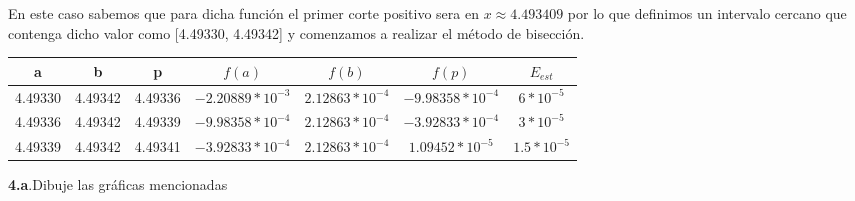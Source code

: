 \documentclass[12pt]{article}
\begin{document}
En este caso sabemos que para dicha función el primer corte positivo sera en $x \approx 4.493409$ por lo que definimos un intervalo cercano que contenga dicho valor como [4.49330, 4.49342]
y comenzamos a realizar el método de bisección. 


\begin{center}
    \begin{tabular}{|c|c|c|c|c|c|c|}
        \hline
        a & b&p&$f(a)$&$f(b)$&$f(p)$&$E_{est}$\\
        \hline
        4.49330    & 4.49342  &  4.49336        & $-2.20889*10^{-3}$& $2.12863*10^{-4}$ & $-9.98358*10^{-4}$ & $6*10^{-5}$\\
        4.49336    & 4.49342  &  4.49339        & $-9.98358*10^{-4}$& $2.12863*10^{-4}$ & $-3.92833*10^{-4}$ & $3*10^{-5}$\\
        4.49339    & 4.49342  &  4.49341        & $-3.92833*10^{-4}$& $2.12863*10^{-4}$ & $1.09452*10^{-5}$  & $1.5*10^{-5}$\\
        \hline
      \end{tabular} 
\end{center}
\textbf{4.a}.Dibuje las gráficas mencionadas 
\end{document}

